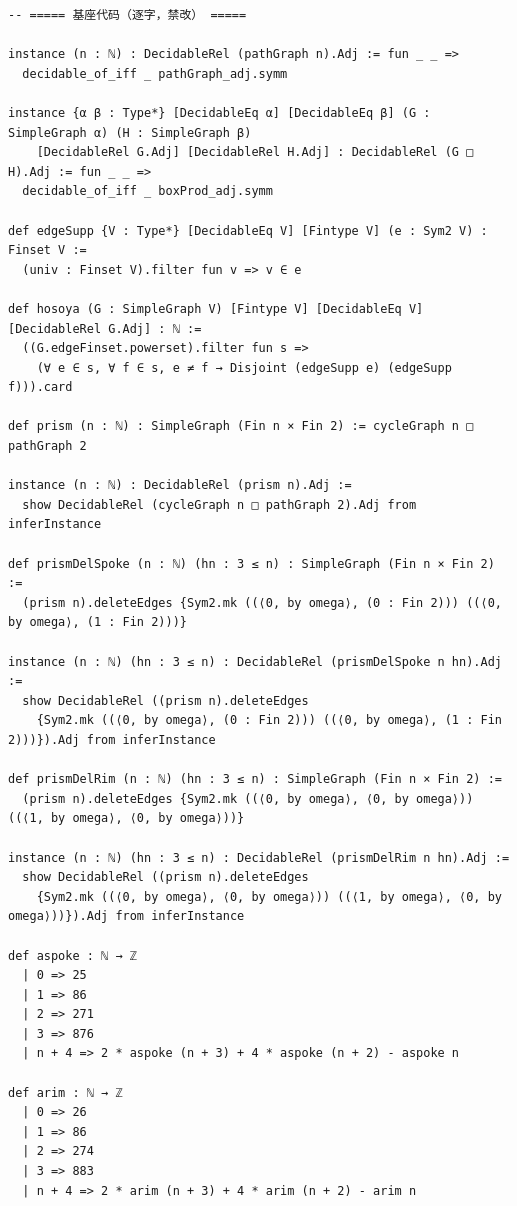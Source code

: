 \documentclass[11pt]{article}
\begin{document}
\begin{lstlisting}[caption={Frozen statement snapshot (Lean 4, verbatim lines
36--98 of \texttt{formalized/statement.lean}, sha256 \texttt{d186ff16}), as an
ordered subsequence with exactly three lines excluded, declared immediately
below.},label={lst:stmt}]
-- ===== 基座代码（逐字，禁改） =====

instance (n : ℕ) : DecidableRel (pathGraph n).Adj := fun _ _ =>
  decidable_of_iff _ pathGraph_adj.symm

instance {α β : Type*} [DecidableEq α] [DecidableEq β] (G : SimpleGraph α) (H : SimpleGraph β)
    [DecidableRel G.Adj] [DecidableRel H.Adj] : DecidableRel (G □ H).Adj := fun _ _ =>
  decidable_of_iff _ boxProd_adj.symm

def edgeSupp {V : Type*} [DecidableEq V] [Fintype V] (e : Sym2 V) : Finset V :=
  (univ : Finset V).filter fun v => v ∈ e

def hosoya (G : SimpleGraph V) [Fintype V] [DecidableEq V] [DecidableRel G.Adj] : ℕ :=
  ((G.edgeFinset.powerset).filter fun s =>
    (∀ e ∈ s, ∀ f ∈ s, e ≠ f → Disjoint (edgeSupp e) (edgeSupp f))).card

def prism (n : ℕ) : SimpleGraph (Fin n × Fin 2) := cycleGraph n □ pathGraph 2

instance (n : ℕ) : DecidableRel (prism n).Adj :=
  show DecidableRel (cycleGraph n □ pathGraph 2).Adj from inferInstance

def prismDelSpoke (n : ℕ) (hn : 3 ≤ n) : SimpleGraph (Fin n × Fin 2) :=
  (prism n).deleteEdges {Sym2.mk ((⟨0, by omega⟩, (0 : Fin 2))) ((⟨0, by omega⟩, (1 : Fin 2)))}

instance (n : ℕ) (hn : 3 ≤ n) : DecidableRel (prismDelSpoke n hn).Adj :=
  show DecidableRel ((prism n).deleteEdges
    {Sym2.mk ((⟨0, by omega⟩, (0 : Fin 2))) ((⟨0, by omega⟩, (1 : Fin 2)))}).Adj from inferInstance

def prismDelRim (n : ℕ) (hn : 3 ≤ n) : SimpleGraph (Fin n × Fin 2) :=
  (prism n).deleteEdges {Sym2.mk ((⟨0, by omega⟩, ⟨0, by omega⟩)) ((⟨1, by omega⟩, ⟨0, by omega⟩))}

instance (n : ℕ) (hn : 3 ≤ n) : DecidableRel (prismDelRim n hn).Adj :=
  show DecidableRel ((prism n).deleteEdges
    {Sym2.mk ((⟨0, by omega⟩, ⟨0, by omega⟩)) ((⟨1, by omega⟩, ⟨0, by omega⟩))}).Adj from inferInstance

def aspoke : ℕ → ℤ
  | 0 => 25
  | 1 => 86
  | 2 => 271
  | 3 => 876
  | n + 4 => 2 * aspoke (n + 3) + 4 * aspoke (n + 2) - aspoke n

def arim : ℕ → ℤ
  | 0 => 26
  | 1 => 86
  | 2 => 274
  | 3 => 883
  | n + 4 => 2 * arim (n + 3) + 4 * arim (n + 2) - arim n



\end{lstlisting}
\end{document}
